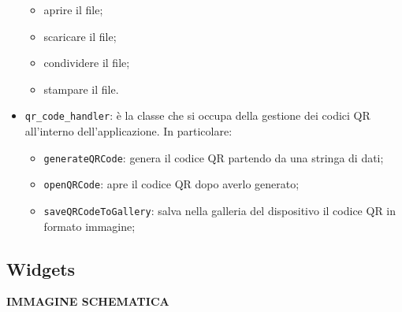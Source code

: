 \documentclass[12pt,a4paper,twoside,openright,titlepage]{book}
\begin{document}
\begin{itemize}
\begin{itemize}
\item aprire il file;
\item scaricare il file;
\item condividere il file;
\item stampare il file.
\end{itemize}
\item \texttt{qr\_code\_handler}: è la classe che si occupa della gestione dei codici QR all'interno dell'applicazione. In particolare:
\begin{itemize}
\item \texttt{generateQRCode}: genera il codice QR partendo da una stringa di dati;
\item \texttt{openQRCode}: apre il codice QR dopo averlo generato;
\item \texttt{saveQRCodeToGallery}: salva nella galleria del dispositivo il codice QR in formato immagine;
\end{itemize}
\end{itemize}

\subsection{Widgets}
\textbf{IMMAGINE SCHEMATICA}\newline
\end{document}
